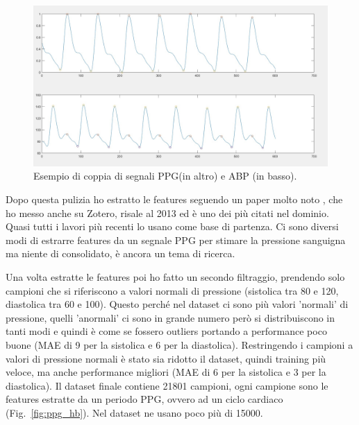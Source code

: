 \documentclass[
	letterpaper,
	a4paper,
	cleardoublepage=empty,
	headings=twolinechapter,
	numbers=autoenddot,
]{article}
\newcommand{\Fig}[0]{Fig.}
\begin{document}
	\begin{figure}[h]
		\centering
		\includegraphics[width=0.4\linewidth]{ImageFiles/data_sample}
		\caption{Esempio di coppia di segnali PPG(in altro) e ABP (in basso).}
		\label{fig:data_sample}
	\end{figure}

	Dopo questa pulizia ho estratto le features seguendo un paper molto noto \cite{6555424}, che ho messo anche su Zotero, risale al 2013 ed è uno dei più citati nel dominio. Quasi tutti i lavori più recenti lo usano come base di partenza. Ci sono diversi modi di estrarre features da un segnale PPG per stimare la pressione sanguigna ma niente di consolidato, è ancora un tema di ricerca.
	
	Una volta estratte le features poi ho fatto un secondo filtraggio, prendendo solo campioni che si riferiscono a valori normali di pressione (sistolica tra 80 e 120, diastolica tra 60 e 100). Questo perché nel dataset ci sono più valori 'normali' di pressione, quelli 'anormali' ci sono in grande numero però si distribuiscono in tanti modi e quindi è come se fossero outliers portando a performance poco buone (MAE di 9 per la sistolica e 6 per la diastolica). Restringendo i campioni a valori di pressione normali è stato sia ridotto il dataset, quindi training più veloce, ma anche performance migliori (MAE di 6 per la sistolica e 3 per la diastolica). Il dataset finale contiene 21801 campioni, ogni campione sono le features estratte da un periodo PPG, ovvero ad un ciclo cardiaco (\Fig~\ref{fig:ppg_hb}). Nel dataset \cite{6555424} ne usano poco più di 15000.
	
\end{document}
